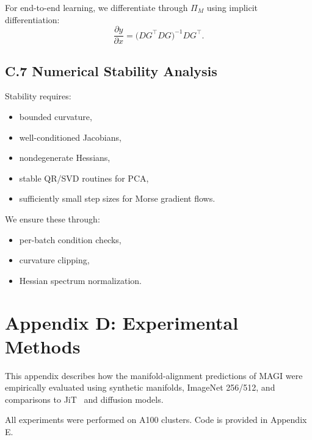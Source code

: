 \documentclass[11pt,a4paper,twocolumn]{article}
\begin{document}
For end-to-end learning, we differentiate through $\Pi_M$ using implicit
differentiation:
\[
\frac{\partial y}{\partial x}
=
\big(DG^\top DG\big)^{-1} DG^\top.
\]


\subsection*{C.7 Numerical Stability Analysis}

Stability requires:

\begin{itemize}
\item bounded curvature,
\item well-conditioned Jacobians,
\item nondegenerate Hessians,
\item stable QR/SVD routines for PCA,
\item sufficiently small step sizes for Morse gradient flows.
\end{itemize}

We ensure these through:

\begin{itemize}
\item per-batch condition checks,
\item curvature clipping,
\item Hessian spectrum normalization.
\end{itemize}


\section*{Appendix D: Experimental Methods}

This appendix describes how the manifold-alignment predictions of MAGI
were empirically evaluated using synthetic manifolds, ImageNet 256/512,
and comparisons to JiT~\cite{li2025backtobasics} and diffusion models.

All experiments were performed on A100 clusters.
Code is provided in Appendix E.

\end{document}
